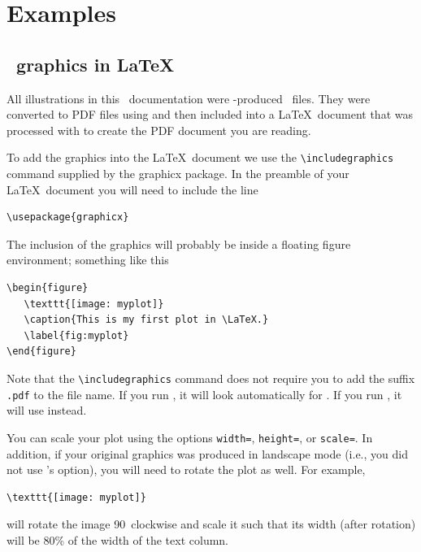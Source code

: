 \section{Examples}
\subsection{\gmt\ graphics in \LaTeX}

All illustrations in this \GMT\ documentation were \GMT-produced \PS\ files. They were converted to PDF files using  and then included into a \LaTeX\ document that was processed with  to create the PDF document you are reading.

To add the graphics into the \LaTeX\ document we use the \verb|\includegraphics| command supplied by the \textsf{graphicx} package. In the preamble of your \LaTeX\ document you will need to include the line
\small
\begin{verbatim}
\usepackage{graphicx}
\end{verbatim}
\normalsize
The inclusion of the graphics will probably be inside a floating figure environment; something like this
\small
\begin{verbatim}
\begin{figure}
   \texttt{[image: myplot]}
   \caption{This is my first plot in \LaTeX.}
   \label{fig:myplot}
\end{figure}
\end{verbatim}
\normalsize
Note that the \verb|\includegraphics| command does not require you to add the suffix \verb|.pdf| to the file name. If you run , it will look automatically for . If you run , it will use  instead.

You can scale your plot using the options \verb|width=|, \verb|height=|, or \verb|scale=|. In addition, if your original graphics was produced in landscape mode (i.e., you did not use \GMT's  option), you will need to rotate the plot as well. For example,
\small
\begin{verbatim}
\texttt{[image: myplot]}
\end{verbatim}
\normalsize
will rotate the image 90\DS\ clockwise and scale it such that its width (after rotation) will be 80\% of the width of the text column.

